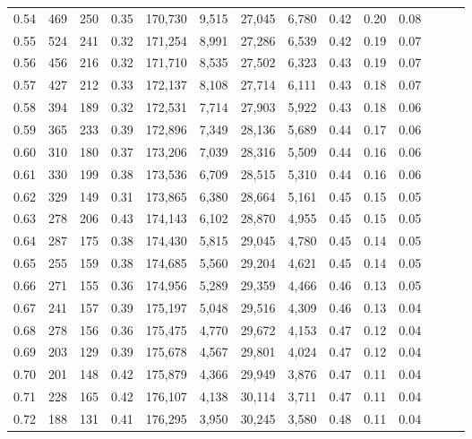 \begin{tabular}{rrrrrrrrrrrrrr}
0.54 &    469 &  250 &  0.35 &  170,730 &    9,515 &  27,045 &   6,780 &  0.42 &  0.20 &      0.08 \\
0.55 &    524 &  241 &  0.32 &  171,254 &    8,991 &  27,286 &   6,539 &  0.42 &  0.19 &      0.07 \\
0.56 &    456 &  216 &  0.32 &  171,710 &    8,535 &  27,502 &   6,323 &  0.43 &  0.19 &      0.07 \\
0.57 &    427 &  212 &  0.33 &  172,137 &    8,108 &  27,714 &   6,111 &  0.43 &  0.18 &      0.07 \\
0.58 &    394 &  189 &  0.32 &  172,531 &    7,714 &  27,903 &   5,922 &  0.43 &  0.18 &      0.06 \\
0.59 &    365 &  233 &  0.39 &  172,896 &    7,349 &  28,136 &   5,689 &  0.44 &  0.17 &      0.06 \\
0.60 &    310 &  180 &  0.37 &  173,206 &    7,039 &  28,316 &   5,509 &  0.44 &  0.16 &      0.06 \\
0.61 &    330 &  199 &  0.38 &  173,536 &    6,709 &  28,515 &   5,310 &  0.44 &  0.16 &      0.06 \\
0.62 &    329 &  149 &  0.31 &  173,865 &    6,380 &  28,664 &   5,161 &  0.45 &  0.15 &      0.05 \\
0.63 &    278 &  206 &  0.43 &  174,143 &    6,102 &  28,870 &   4,955 &  0.45 &  0.15 &      0.05 \\
0.64 &    287 &  175 &  0.38 &  174,430 &    5,815 &  29,045 &   4,780 &  0.45 &  0.14 &      0.05 \\
0.65 &    255 &  159 &  0.38 &  174,685 &    5,560 &  29,204 &   4,621 &  0.45 &  0.14 &      0.05 \\
0.66 &    271 &  155 &  0.36 &  174,956 &    5,289 &  29,359 &   4,466 &  0.46 &  0.13 &      0.05 \\
0.67 &    241 &  157 &  0.39 &  175,197 &    5,048 &  29,516 &   4,309 &  0.46 &  0.13 &      0.04 \\
0.68 &    278 &  156 &  0.36 &  175,475 &    4,770 &  29,672 &   4,153 &  0.47 &  0.12 &      0.04 \\
0.69 &    203 &  129 &  0.39 &  175,678 &    4,567 &  29,801 &   4,024 &  0.47 &  0.12 &      0.04 \\
0.70 &    201 &  148 &  0.42 &  175,879 &    4,366 &  29,949 &   3,876 &  0.47 &  0.11 &      0.04 \\
0.71 &    228 &  165 &  0.42 &  176,107 &    4,138 &  30,114 &   3,711 &  0.47 &  0.11 &      0.04 \\
0.72 &    188 &  131 &  0.41 &  176,295 &    3,950 &  30,245 &   3,580 &  0.48 &  0.11 &      0.04 \\

\end{tabular}

